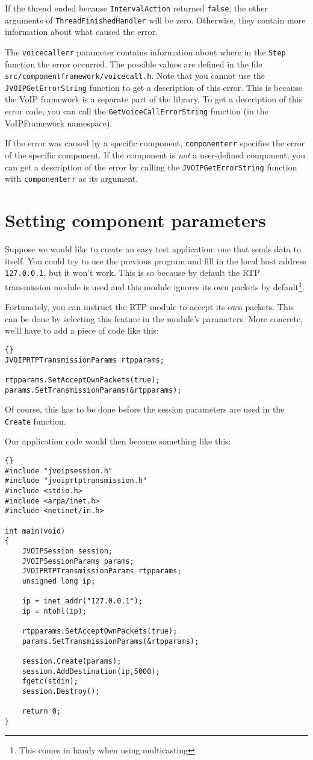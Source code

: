 		If the thread ended because {\tt IntervalAction} returned {\tt false},
		the other arguments of {\tt Thread\-Finished\-Handler} will be zero.
		Otherwise, they contain more information about what caused the error.
		
		The {\tt voicecallerr} parameter contains information about where in the
		{\tt Step} function the error occurred. The possible values are defined
		in the file {\tt src/\-component\-framework/\-voice\-call.h}. Note that
		you cannot use the {\tt JVOIPGetErrorString} function to get a description
		of this error. This is because the VoIP framework is a separate part of
		the library. To get a description of this error code, you can call the
		{\tt GetVoiceCallErrorString} function (in the VoIPFramework namespace).
		
		If the error was caused by a specific component, {\tt com\-ponent\-err}
		specifies the error of the specific component. If the component is {\em not}
		a user-defined component, you can get a description of the error by calling
		the {\tt JVOIPGetErrorString} function with {\tt componenterr} as its
		argument.
		
	\section{Setting component parameters}
	Suppose we would like to create an easy test application: one that sends
	data to itself. You could try to use the previous program and fill in the
	local host address {\tt 127.0.0.1}, but it won't work. This is so because
	by default the RTP transmission module is used and this module ignores
	its own packets by default\footnote{This comes in handy when using multicasting}.
	
	Fortunately, you can instruct the RTP module to accept its own packets.
	This can be done by selecting this feature in the module's parameters.
	More concrete, we'll have to add a piece of code like this:
	\begin{lstlisting}[frame=tb]{}
JVOIPRTPTransmissionParams rtpparams;

rtpparams.SetAcceptOwnPackets(true);
params.SetTransmissionParams(&rtpparams);
	\end{lstlisting}
	Of course, this has to be done before the session parameters are used in
	the {\tt Create} function.
	
	Our application code would then become something like this:
	\begin{lstlisting}[frame=tb]{}
#include "jvoipsession.h"
#include "jvoiprtptransmission.h"
#include <stdio.h>
#include <arpa/inet.h>
#include <netinet/in.h>

int main(void)
{
	JVOIPSession session;
	JVOIPSessionParams params;
	JVOIPRTPTransmissionParams rtpparams;
	unsigned long ip;

	ip = inet_addr("127.0.0.1");
	ip = ntohl(ip);

	rtpparams.SetAcceptOwnPackets(true);
	params.SetTransmissionParams(&rtpparams);

	session.Create(params);
	session.AddDestination(ip,5000);
	fgetc(stdin);
	session.Destroy();

	return 0;
}
	\end{lstlisting}
	
